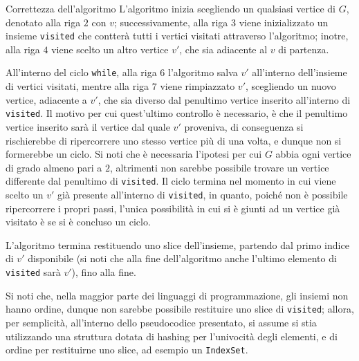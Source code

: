 \documentclass[a4paper, 12pt]{report}
\begin{document}
    \begin{framedobs}{Correttezza dell'algoritmo}
        L'algoritmo inizia scegliendo un qualsiasi vertice di $G$, denotato alla riga $2$ con $v$; successivamente, alla riga $3$ viene inizializzato un insieme \texttt{visited} che contterà tutti i vertici visitati attraverso l'algoritmo; inotre, alla riga $4$ viene scelto un altro vertice $v'$, che sia adiacente al $v$ di partenza.

        All'interno del ciclo \texttt{while}, alla riga $6$ l'algoritmo salva $v'$ all'interno dell'insieme di vertici visitati, mentre alla riga $7$ viene rimpiazzato $v'$, scegliendo un nuovo vertice, adiacente a $v'$, che sia diverso dal penultimo vertice inserito all'interno di \texttt{visited}. Il motivo per cui quest'ultimo controllo è necessario, è che il penultimo vertice inserito sarà il vertice dal quale $v'$ proveniva, di conseguenza si rischierebbe di ripercorrere uno stesso vertice più di una volta, e dunque non si formerebbe un ciclo. Si noti che è necessaria l'ipotesi per cui $G$ abbia ogni vertice di grado almeno pari a $2$, altrimenti non sarebbe possibile trovare un vertice differente dal penultimo di \texttt{visited}. Il ciclo termina nel momento in cui viene scelto un $v'$ già presente all'interno di \texttt{visited}, in quanto, poiché non è possibile ripercorrere i propri passi, l'unica possibilità in cui si è giunti ad un vertice già visitato è se si è concluso un ciclo.
        
        L'algoritmo termina restituendo uno slice dell'insieme, partendo dal primo indice di $v'$ disponibile (si noti che alla fine dell'algoritmo anche l'ultimo elemento di \texttt{visited} sarà $v'$), fino alla fine.

        Si noti che, nella maggior parte dei linguaggi di programmazione, gli insiemi non hanno ordine, dunque non sarebbe possibile restituire uno slice di \texttt{visited}; allora, per semplicità, all'interno dello pseudocodice presentato, si assume si stia utilizzando una struttura dotata di hashing per l'univocità degli elementi, e di ordine per restituirne uno slice, ad esempio un \texttt{IndexSet}.
    \end{framedobs}
\end{document}
